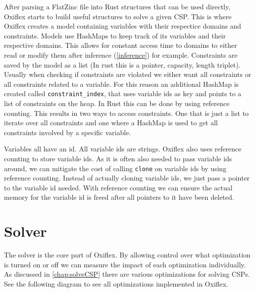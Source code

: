 After parsing a FlatZinc file into Rust structures that can be used directly, Oxiflex starts to build useful structures to solve a given CSP. This is where Oxiflex creates a model containing variables with their respectice domains and constraints. Models use HashMaps to keep track of its variables and their respective domains. This allows for constant access time to domains to either read or modify them after inference (\ref{inference}) for example. Constraints are saved by the model as a list (In rust this is a pointer, capacity, length triplet). Usually when checking if constraints are violated we either want all constraints or all constraints related to a variable. For this reason an additional HashMap is created called \verb|constraint_index|, that uses variable ids as key and points to a list of constraints on the heap. In Rust this can be done by using reference counting. This results in two ways to access constraints. One that is just a list to iterate over all constraints and one where a HashMap is used to get all constraints involved by a specific variable.

Variables all have an id. All variable ids are strings. Oxiflex also uses reference counting to store variable ids. As it is often also needed to pass variable ids around, we can mitigate the cost of calling \verb|clone| on variable ids by using reference counting. Instead of actually cloning variable ids, we just pass a pointer to the variable id needed. With reference counting we can ensure the actual memory for the variable id is freed after all pointers to it have been deleted.

\section{Solver}

The solver is the core part of Oxiflex. By allowing control over what optimization is turned on or off we can measure the impact of each optimization individually. As discussed in \cref{chap:solveCSP} there are various optimizations for solving CSPs. See the following diagram to see all optimizations implemented in Oxiflex. \\


